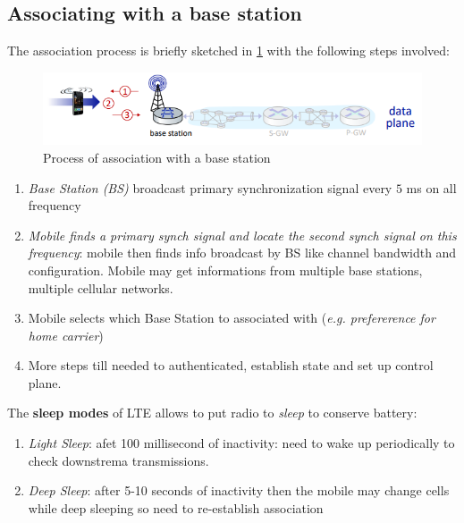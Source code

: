 \documentclass[10pt,a4paper]{report}
\theoremstyle{definition}
\begin{document}
\subsection{Associating with a base station}\label{sec:associating-with-a-base-station}
The association process is briefly sketched in \ref{association-process} with the following steps involved:
\begin{figure}[h]
	\centering\includegraphics[scale=0.50]{images/Pasted image 20230309164925.png}
	\caption{Process of association with a base station}
	\label{association-process}
\end{figure}

\begin{enumerate}
	\item 
	\textit{Base Station (BS)} broadcast primary synchronization signal every $5$ ms on all frequency
	\item 
	\textit{Mobile finds a primary synch signal and locate the second synch signal on this frequency}: mobile then finds info broadcast by BS like channel bandwidth and configuration. Mobile may get informations from multiple base stations, multiple cellular networks.
	\item 
	Mobile selects which Base Station to associated with (\textit{e.g. prefererence for home carrier})
	\item 
	More steps till needed to authenticated, establish state and set up control plane.
\end{enumerate}

The \textbf{sleep modes} of LTE allows to put radio to \textit{sleep} to conserve battery:
\begin{enumerate}
	\item 
	\textit{Light Sleep}: afet 100 millisecond of inactivity: need to wake up periodically to check downstrema transmissions.
	\item 
	\textit{Deep Sleep}: after 5-10 seconds of inactivity then the mobile may change cells while deep sleeping so need to re-establish association
\end{enumerate}
\end{document}
